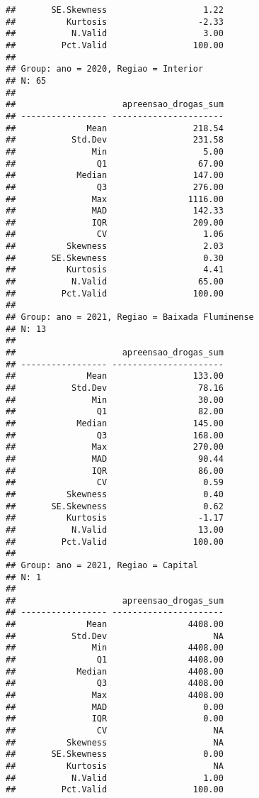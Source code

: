 \documentclass[
]{article}
\begin{document}
\begin{verbatim}
##       SE.Skewness                   1.22
##          Kurtosis                  -2.33
##           N.Valid                   3.00
##         Pct.Valid                 100.00
## 
## Group: ano = 2020, Regiao = Interior  
## N: 65  
## 
##                     apreensao_drogas_sum
## ----------------- ----------------------
##              Mean                 218.54
##           Std.Dev                 231.58
##               Min                   5.00
##                Q1                  67.00
##            Median                 147.00
##                Q3                 276.00
##               Max                1116.00
##               MAD                 142.33
##               IQR                 209.00
##                CV                   1.06
##          Skewness                   2.03
##       SE.Skewness                   0.30
##          Kurtosis                   4.41
##           N.Valid                  65.00
##         Pct.Valid                 100.00
## 
## Group: ano = 2021, Regiao = Baixada Fluminense  
## N: 13  
## 
##                     apreensao_drogas_sum
## ----------------- ----------------------
##              Mean                 133.00
##           Std.Dev                  78.16
##               Min                  30.00
##                Q1                  82.00
##            Median                 145.00
##                Q3                 168.00
##               Max                 270.00
##               MAD                  90.44
##               IQR                  86.00
##                CV                   0.59
##          Skewness                   0.40
##       SE.Skewness                   0.62
##          Kurtosis                  -1.17
##           N.Valid                  13.00
##         Pct.Valid                 100.00
## 
## Group: ano = 2021, Regiao = Capital  
## N: 1  
## 
##                     apreensao_drogas_sum
## ----------------- ----------------------
##              Mean                4408.00
##           Std.Dev                     NA
##               Min                4408.00
##                Q1                4408.00
##            Median                4408.00
##                Q3                4408.00
##               Max                4408.00
##               MAD                   0.00
##               IQR                   0.00
##                CV                     NA
##          Skewness                     NA
##       SE.Skewness                   0.00
##          Kurtosis                     NA
##           N.Valid                   1.00
##         Pct.Valid                 100.00

\end{verbatim}
\end{document}
